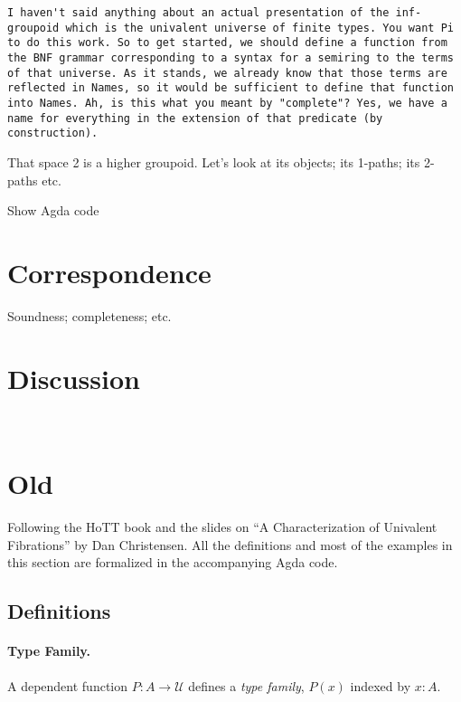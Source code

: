 \documentclass{entcs}
\begin{document}
\begin{verbatim}
I haven't said anything about an actual presentation of the inf-groupoid which is the univalent universe of finite types. You want Pi to do this work. So to get started, we should define a function from the BNF grammar corresponding to a syntax for a semiring to the terms of that universe. As it stands, we already know that those terms are reflected in Names, so it would be sufficient to define that function into Names. Ah, is this what you meant by "complete"? Yes, we have a name for everything in the extension of that predicate (by construction).

\end{verbatim}


That space {2} is a higher groupoid. Let's look at its objects; its 1-paths; its
2-paths etc.

Show Agda code

\section{Correspondence}

Soundness; completeness; etc.


\section{Discussion}

\newpage
~
\newpage
\section{Old}

Following the HoTT book and the slides on ``A Characterization of Univalent
Fibrations'' by Dan Christensen. All the definitions and most of the examples in
this section are formalized in the accompanying Agda code.

\subsection{Definitions}

\paragraph*{Type Family.} A dependent function $P : A \to \mathcal{U}$ defines a
\emph{type family}, $P(x)$ indexed by $x:A$.
\end{document}
